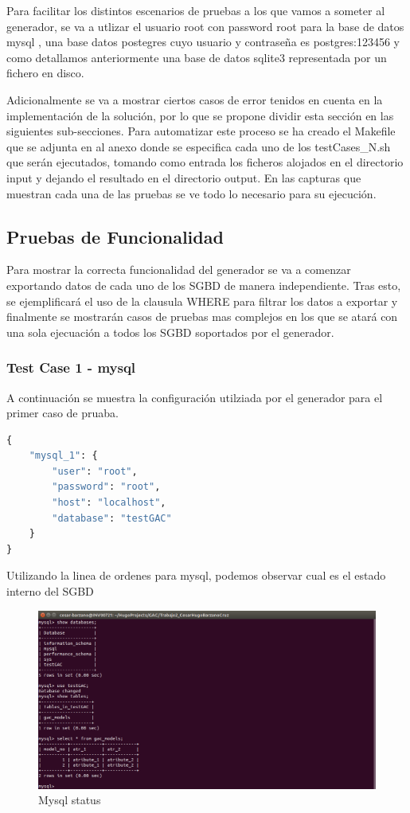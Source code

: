 \documentclass[a4paper,11pt]{book}
\begin{document}
Para facilitar los distintos escenarios de pruebas a los que vamos a someter al generador, se va a utlizar el usuario root con password root para la base de datos mysql , una base datos postegres cuyo usuario y contraseña es postgres:123456 y como detallamos anteriormente una base de datos sqlite3 representada por un fichero en disco.


Adicionalmente se va a mostrar ciertos casos de error tenidos en cuenta en la implementación de la solución, por lo que se propone dividir esta sección en las siguientes sub-secciones. Para automatizar este proceso se ha creado el Makefile que se adjunta en al anexo donde se especifica cada uno de los testCases\_N.sh que serán ejecutados, tomando como entrada los ficheros alojados en el directorio input y dejando el resultado en el directorio output. En las capturas que muestran cada una de las pruebas se ve todo lo necesario para su ejecución.  

\subsection{Pruebas de Funcionalidad}
Para mostrar la correcta funcionalidad del generador se va a comenzar exportando datos de cada uno de los SGBD de manera independiente. Tras esto, se ejemplificará el uso de la clausula WHERE para filtrar los datos a exportar y finalmente se mostrarán casos de pruebas mas complejos en los que se atará con una sola ejecuación a todos los SGBD soportados por el generador.  

\subsubsection{Test Case 1 - mysql}

A continuación se muestra la configuración utilziada por el generador para el primer caso de pruaba. 

\begin{lstlisting}[language=python,caption={GAC\_GENERATOR\_CONFIG\_1.json }]
 {
	"mysql_1": {
		"user": "root",
		"password": "root",
		"host": "localhost",
		"database": "testGAC"
	}
}
\end{lstlisting}

Utilizando la linea de ordenes para mysql, podemos observar cual es el estado interno del SGBD

\begin{figure}[H]  
\centering 
\includegraphics[scale=0.35]{imagenes/TestCase1_mysql.png}
\caption{ Mysql status  }  
\end{figure} 
\end{document}
